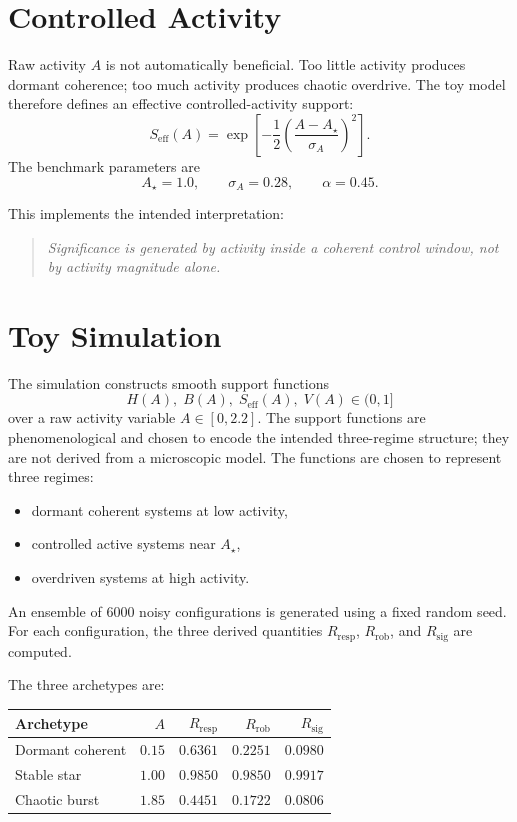 \documentclass[11pt,a4paper]{article}
\newcommand{\Rresp}{R_{\mathrm{resp}}}
\newcommand{\Rrob}{R_{\mathrm{rob}}}
\newcommand{\Rsig}{R_{\mathrm{sig}}}
\newcommand{\Seff}{S_{\mathrm{eff}}}
\begin{document}
\section{Controlled Activity}

Raw activity $A$ is not automatically beneficial.
Too little activity produces dormant coherence; too much activity produces
chaotic overdrive.
The toy model therefore defines an effective controlled-activity support:
\begin{equation}
\boxed{
\Seff(A)
=
\exp\!\left[
-\frac12
\left(\frac{A-A_\star}{\sigma_A}\right)^2
\right].
}
\label{eq:seff}
\end{equation}
The benchmark parameters are
\begin{equation}
A_\star=1.0,
\qquad
\sigma_A=0.28,
\qquad
\alpha=0.45.
\end{equation}

This implements the intended interpretation:
\begin{quote}
\emph{Significance is generated by activity inside a coherent control window,
not by activity magnitude alone.}
\end{quote}

\section{Toy Simulation}

The simulation constructs smooth support functions
\[
H(A),\;B(A),\;\Seff(A),\;V(A)
\in(0,1]
\]
over a raw activity variable $A\in[0,2.2]$.
The support functions are phenomenological and chosen to encode the intended
three-regime structure; they are not derived from a microscopic model.
The functions are chosen to represent three regimes:
\begin{itemize}[leftmargin=1.5em]
\item dormant coherent systems at low activity,
\item controlled active systems near $A_\star$,
\item overdriven systems at high activity.
\end{itemize}

An ensemble of $6000$ noisy configurations is generated using a fixed random
seed.
For each configuration, the three derived quantities
$\Rresp$, $\Rrob$, and $\Rsig$ are computed.

The three archetypes are:
\begin{center}
\begin{tabular}{lrrrr}
\toprule
\textbf{Archetype} & $A$ & $\Rresp$ & $\Rrob$ & $\Rsig$ \\
\midrule
Dormant coherent & $0.15$ & $0.6361$ & $0.2251$ & $0.0980$ \\
Stable star & $1.00$ & $0.9850$ & $0.9850$ & $0.9917$ \\
Chaotic burst & $1.85$ & $0.4451$ & $0.1722$ & $0.0806$ \\
\bottomrule
\end{tabular}
\end{center}
\end{document}
